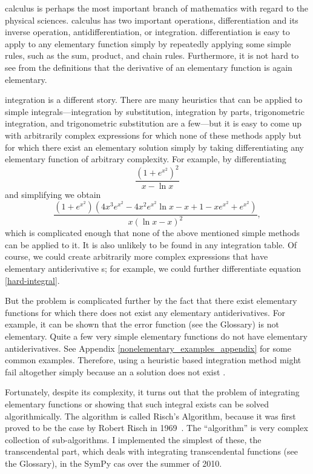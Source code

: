 \Gls{calculus} is perhaps the most important branch of mathematics with
regard to the physical sciences.  \Gls{calculus} has two important
operations, \gls{differentiation} and its inverse operation,
antidifferentiation, or \gls{integration}.  \Gls{differentiation} is
easy to apply to any \gls{elementary} function simply by repeatedly
applying some simple rules, such as the sum, product, and chain rules.
Furthermore, it is not hard to see from the definitions that the
derivative of an \gls{elementary} function is again \gls{elementary}.

\Gls{integration} is a different story.  There are many heuristics that
can be applied to simple integrals---\gls{integration} by substitution,
\gls{integration} by parts, trigonometric \gls{integration}, and
trigonometric substitution are a few---but it is easy to come up with
arbitrarily complex expressions for which none of these methods apply
but for which there exist an \gls{elementary} solution simply by taking
differentiating any elementary function of arbitrary complexity.  For
example, by differentiating
\begin{equation}
\label{hard-integral-sol}
\frac{\left(1 + e^{x^{2}}\right)^{2}}{x - \ln{x}}
\end{equation}
and simplifying we obtain
\begin{equation}
\label{hard-integral}
    \frac{\left( 1 + e^{x^2} \right)
        \left(4x^3e^{x^2} - 4x^2e^{x^2}\ln{x} - x + 1 - xe^{x^2} +
        e^{x^2}\right)}
    {x\left(\ln{x} - x\right)^2},
\end{equation}
which is complicated enough that none of the above mentioned simple
methods can be applied to it.  It is also unlikely to be found in any
integration table.  Of course, we could create arbitrarily more complex
expressions that have elementary antiderivative s; for example, we
could further differentiate equation \ref{hard-integral}. 

But the problem is complicated further by the fact that there exist
\gls{elementary} functions for which there does not exist any
\gls{elementary} antiderivatives.  For example, it can be shown that
the \gls{error function} (see the Glossary) is not elementary.  Quite a
few very simple elementary functions do not have elementary
antiderivatives.  See Appendix \ref{nonelementary_examples_appendix}
for some common examples. Therefore, using a heuristic based
\gls{integration} method might fail altogether simply because an a
solution does not exist .

Fortunately, despite its complexity, it turns out that the problem of
integrating elementary functions or showing that such integral exists
can be solved algorithmically.  The algorithm is called Risch's
Algorithm, because it was first proved to be the case by Robert Risch in
1969~\cite{risch1969problem}.  The ``algorithm'' is very complex
collection of sub-algorithms.  I implemented the simplest of these, the
\gls{transcendental} part, which deals with integrating
\gls{transcendental} functions (see the Glossary), in the SymPy
\gls{cas} over the summer of 2010.
